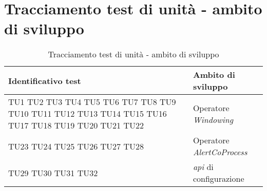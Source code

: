 \section{Tracciamento test di unità - ambito di sviluppo}
{
\centering
\begin{longtable}{L{5cm} L{8.5cm}}
\caption{Tracciamento test di unità - ambito di sviluppo}\\
\textbf{Identificativo test} &
\textbf{Ambito di sviluppo}\\
\endhead
\hline

TU1 \newline TU2 \newline TU3 \newline TU4 \newline TU5 \newline TU6 \newline TU7 \newline TU8 \newline TU9 \newline TU10 \newline TU11 \newline TU12 \newline TU13 \newline TU14 \newline TU15 \newline TU16 \newline TU17 \newline TU18 \newline TU19 \newline TU20 \newline TU21 \newline TU22 & Operatore \textit{Windowing} \\
\hline
TU23 \newline TU24 \newline TU25 \newline TU26 \newline TU27 \newline TU28 & Operatore \textit{AlertCoProcess} \\
\hline
TU29 \newline TU30 \newline TU31 \newline TU32 & \textit{\gls{api}} di configurazione\\
\hline
\end{longtable}
}


